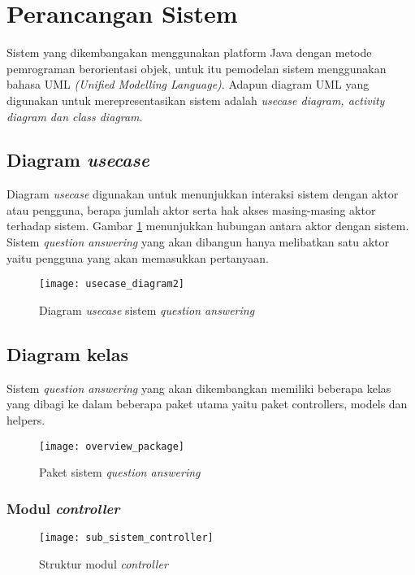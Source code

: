 \section{Perancangan Sistem}
Sistem yang dikembangakan menggunakan platform Java dengan metode pemrograman berorientasi objek, untuk itu pemodelan sistem menggunakan bahasa UML \emph{(Unified Modelling Language)}. Adapun diagram UML yang digunakan untuk merepresentasikan sistem adalah \emph{usecase diagram, activity diagram dan class diagram}. 

\subsection{Diagram \emph{usecase}}
Diagram \emph{usecase} digunakan untuk menunjukkan interaksi sistem dengan aktor atau pengguna, berapa jumlah aktor serta hak akses masing-masing aktor terhadap sistem. Gambar \ref{fig:usecase_diagram} menunjukkan hubungan antara aktor dengan sistem. Sistem \emph{question answering} yang akan dibangun hanya melibatkan satu aktor yaitu pengguna yang akan memasukkan pertanyaan.

\begin{figure}[ht]
    \centering
    \texttt{[image: usecase\_diagram2]}
    \caption{Diagram \emph{usecase} sistem \emph{question answering}}
    \label{fig:usecase_diagram}
\end{figure}

\subsection{Diagram kelas}
Sistem \emph{question answering} yang akan dikembangkan memiliki beberapa kelas yang dibagi ke dalam beberapa paket utama yaitu paket controllers, models dan helpers.

\begin{figure}[tb]
    \centering
    \texttt{[image: overview\_package]}
    \caption{Paket sistem \emph{question answering}}
    \label{fig:overview_package}
\end{figure}

\subsubsection{Modul \emph{controller}}

\begin{figure}[tb]
    \centering
    \texttt{[image: sub\_sistem\_controller]}
    \caption{Struktur modul \emph{controller}} 
    \label{fig:sub_sistem_controller}
\end{figure}

